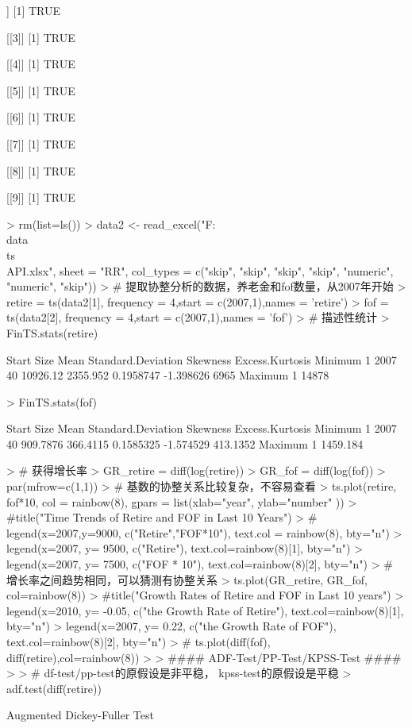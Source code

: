 \documentclass{article}
\begin{document}
\begin{Schunk}
\begin{Soutput}
[[2]]
[1] TRUE

[[3]]
[1] TRUE

[[4]]
[1] TRUE

[[5]]
[1] TRUE

[[6]]
[1] TRUE

[[7]]
[1] TRUE

[[8]]
[1] TRUE

[[9]]
[1] TRUE
\end{Soutput}
\begin{Sinput}
> rm(list=ls())
> data2 <- read_excel("F:\\data\\ts\\API.xlsx", sheet = "RR", col_types = c("skip", "skip", "skip", "skip", "numeric", "numeric", "skip"))
> # 提取协整分析的数据，养老金和fof数量，从2007年开始
> retire = ts(data2[1], frequency = 4,start = c(2007,1),names = 'retire')
> fof = ts(data2[2], frequency = 4,start = c(2007,1),names = 'fof')
> # 描述性统计
> FinTS.stats(retire)
\end{Sinput}
\begin{Soutput}
  Start Size     Mean Standard.Deviation  Skewness Excess.Kurtosis Minimum
1  2007   40 10926.12           2355.952 0.1958747       -1.398626    6965
  Maximum
1   14878
\end{Soutput}
\begin{Sinput}
> FinTS.stats(fof)
\end{Sinput}
\begin{Soutput}
  Start Size     Mean Standard.Deviation  Skewness Excess.Kurtosis  Minimum
1  2007   40 909.7876           366.4115 0.1585325       -1.574529 413.1352
   Maximum
1 1459.184
\end{Soutput}
\begin{Sinput}
> # 获得增长率
> GR_retire = diff(log(retire))
> GR_fof = diff(log(fof))
> par(mfrow=c(1,1))
> # 基数的协整关系比较复杂，不容易查看
> ts.plot(retire, fof*10, col = rainbow(8), gpars = list(xlab="year", ylab="number" ))
> #title("Time Trends of Retire and FOF in Last 10 Years")
> # legend(x=2007,y=9000, c("Retire","FOF*10"), text.col = rainbow(8), bty="n")
> legend(x=2007, y= 9500, c("Retire"), text.col=rainbow(8)[1], bty="n")
> legend(x=2007, y= 7500, c("FOF * 10"), text.col=rainbow(8)[2], bty="n")
> # 增长率之间趋势相同，可以猜测有协整关系
> ts.plot(GR_retire, GR_fof, col=rainbow(8))
> #title("Growth Rates of Retire and FOF in Last 10 years")
> legend(x=2010, y= -0.05, c("the Growth Rate of Retire"), text.col=rainbow(8)[1], bty="n")
> legend(x=2007, y= 0.22, c("the Growth Rate of FOF"), text.col=rainbow(8)[2], bty="n")
> # ts.plot(diff(fof), diff(retire),col=rainbow(8))
> 
> #### ADF-Test/PP-Test/KPSS-Test ####
> 
> # df-test/pp-test的原假设是非平稳， kpss-test的原假设是平稳
> adf.test(diff(retire))
\end{Sinput}
\begin{Soutput}
	Augmented Dickey-Fuller Test


\end{Soutput}
\end{Schunk}
\end{document}
